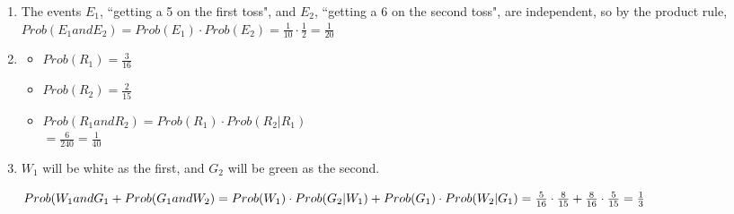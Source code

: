 {\begin{enumerate}
        \item   The events $E_{1}$, ``getting a 5 on the first toss",
                and $E_{2}$, ``getting a 6 on the second toss", are independent,
                so by the product rule,
                $Prob(E_{1} and E_{2}) = Prob(E_{1}) \cdot Prob(E_{2}) = \frac{1}{10} \cdot \frac{1}{2}
                = \frac{1}{20}$

        \item
            \begin{itemize}
                \item   $Prob(R_{1}) = \frac{3}{16}$
                \item   $Prob(R_{2}) = \frac{2}{15}$
                \item   $Prob(R_{1} and R_{2}) = Prob(R_{1}) \cdot Prob(R_{2} | R_{1})$ \\
                        $ = \frac{6}{240} = \frac{1}{40}$
            \end{itemize}

        \item   $W_{1}$ will be white as the first, and $G_{2}$ will be green as the second.

                $Prob(W_{1} and G_{1} + Prob(G_{1} and W_{2}) = \\
                    Prob(W_{1}) \cdot Prob(G_{2} | W_{1}) + Prob(G_{1}) \cdot Prob(W_{2}|G_{1}) \\
                    = \frac{5}{16} \cdot \frac{8}{15} + \frac{8}{16} \cdot \frac{5}{15} = \frac{1}{3}$
    \end{enumerate}

}


